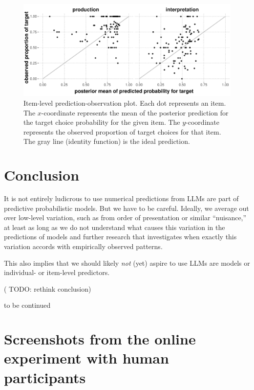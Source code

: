 \documentclass[fleqn]{article}
\begin{document}
\begin{figure}
  \centering

  \includegraphics[width = 0.9\linewidth]{00-pics/item-combined-obs-pred.pdf}

  \caption{
    Item-level prediction-observation plot.
    Each dot represents an item.
    The $x$-coordinate represents the mean of the posterior prediction for the target choice probability for the given item.
    The $y$-coordinate represents the observed proportion of target choices for that item.
    The gray line (identity function) is the ideal prediction.
  }
  \label{fig:item-level-obs-pred}
\end{figure}


\section{Conclusion}
\label{conclusion}

It is not entirely ludicrous to use numerical predictions from LLMs are
part of predictive probabilistic models. But we have to be careful.
Ideally, we average out over low-level variation, such as from order of
presentation or similar ``nuisance,'' at least as long as we do not
understand what causes this variation in the predictions of models and
further research that investigates when exactly this variation accords
with empirically observed patterns.

This also implies that we should likely \emph{not} (yet) aspire to use
LLMs are models or individual- or item-level predictors.

( {TODO: rethink conclusion})

{to be continued}

\newpage
\appendix


\section{Screenshots from the online experiment with human participants}
\label{sec:scre-from-online}
\end{document}
